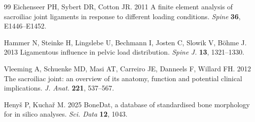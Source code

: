 \documentclass[openacc]{rsproca_new}
\begin{document}
\begin{thebibliography}{99}
Eichenseer PH, Sybert DR, Cotton JR. 2011 A finite element analysis of sacroiliac joint ligaments in response to different loading conditions. \textit{Spine} \textbf{36}, E1446--E1452.

Hammer N, Steinke H, Lingslebe U, Bechmann I, Josten C, Slowik V, B\"{o}hme J. 2013 Ligamentous influence in pelvic load distribution. \textit{Spine J.} \textbf{13}, 1321--1330.

Vleeming A, Schuenke MD, Masi AT, Carreiro JE, Danneels F, Willard FH. 2012 The sacroiliac joint: an overview of its anatomy, function and potential clinical implications. \textit{J. Anat.} \textbf{221}, 537--567.

Heny\v{s} P, Kucha\v{r} M. 2025 BoneDat, a database of standardised bone morphology for in silico analyses. \textit{Sci. Data} \textbf{12}, 1043.

\end{thebibliography}
\end{document}
